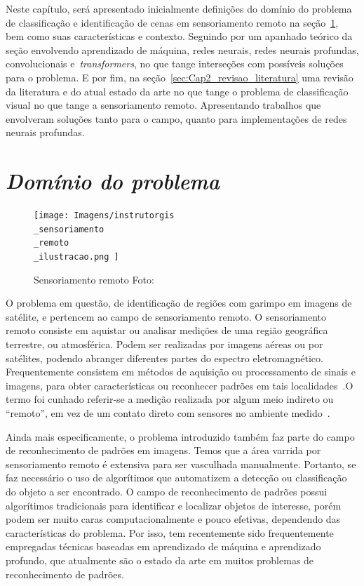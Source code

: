 Neste capítulo, será apresentado inicialmente definições do domínio do problema de classificação e identificação de cenas em sensoriamento remoto na seção~\ref{sec:Cap2_dominio}, bem como suas características e contexto. Seguindo por um apanhado teórico da seção envolvendo aprendizado de máquina, redes neurais, redes neurais profundas, convolucionais e~\textit{transformers}, no que tange interseções com possíveis soluções para o problema.
E por fim, na seção~\ref{sec:Cap2_revisao_literatura} uma revisão da literatura e do atual estado da arte no que tange o problema de classificação visual no que tange a sensoriamento remoto. Apresentando trabalhos que envolveram soluções tanto para o campo, quanto para implementações de redes neurais profundas.



\section{\textit{Domínio do problema}}\label{sec:Cap2_dominio}
\begin{figure}[!ht]
    \centering
    \texttt{[image: 
        Imagens/instrutorgis\\\_sensoriamento\\\_remoto\\\_ilustracao.png
    ]}
    \caption{Sensoriamento remoto Foto:\cite{InstrutorGIS}}
\label{fig:sensoriamento}
\end{figure}

O problema em questão, de identificação de regiões com garimpo em imagens de satélite, e pertencem ao campo de sensoriamento remoto. O sensoriamento remoto consiste em aquistar ou analisar medições de uma região geográfica terrestre, ou atmosférica. Podem ser realizadas por imagens aéreas ou por satélites, podendo abranger diferentes partes do espectro eletromagnético.
Frequentemente consistem em métodos de aquisição ou processamento de sinais e imagens, para obter características ou reconhecer padrões em tais localidades~\cite{emery2017introduction}.O termo foi cunhado referir-se a medição realizada por algum meio indireto ou “remoto”, em vez de um contato direto com sensores no ambiente medido~\cite{emery2017introduction}.


Ainda mais especificamente, o problema introduzido também faz parte do campo de reconhecimento de padrões em imagens. Temos que a área varrida por sensoriamento remoto é extensiva para ser vasculhada manualmente. Portanto, se faz necessário o uso de algorítimos que automatizem a detecção ou classificação do objeto a ser encontrado.
O campo de reconhecimento de padrões possui algorítimos tradicionais para identificar e localizar objetos de interesse, porém podem ser muito caras computacionalmente e pouco efetivas, dependendo das características do problema. Por isso, tem recentemente sido frequentemente empregadas técnicas baseadas em aprendizado de máquina e aprendizado profundo, que atualmente são o estado da arte em muitos problemas de reconhecimento de padrões.


